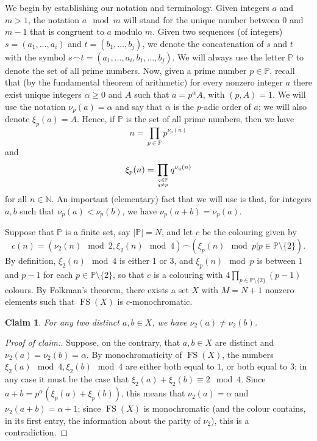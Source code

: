 \documentclass[10pt]{amsart}
\DeclareMathOperator{\fs}{FS}
\newtheorem{claim}{Claim}%
\theoremstyle{definition}
\begin{document}
We begin by establishing our notation and terminology. Given integers $a$ and $m>1$, the notation $a\mod m$ will stand for the unique number between $0$ and $m-1$ that is congruent to $a$ modulo $m$. Given two sequences (of integers) $s=(a_1,\ldots,a_i)$ and $t=(b_1,\ldots,b_j)$, we denote the concatenation of $s$ and $t$ with the symbol $s\frown t=(a_1,\ldots,a_i,b_1,\ldots,b_j)$. We will always use the letter $\mathbb P$ to denote the set of all prime numbers. Now, given a prime number $p\in\mathbb P$, recall that (by the fundamental theorem of arithmetic) for every nonzero integer $a$ there exist unique integers $\alpha\geq0$ and $A$ such that $a=p^\alpha A$, with $(p,A)=1$. We will use the notation $\nu_p(a)=\alpha$ and say that $\alpha$ is the $p$-adic order of $a$; we will also denote $\xi_p(a)=A$. Hence, if $\mathbb P$ is the set of all prime numbers, then we have
\begin{equation*}
n=\prod_{p\in\mathbb P}p^{\nu_p(n)}
\end{equation*}
and
\begin{equation*}
\xi_p(n)=\prod_{{q\in\mathbb P}\atop{q\neq p}}q^{\nu_q(n)}
\end{equation*}
for all $n\in\mathbb N$. An important (elementary) fact that we will use is that, for integers $a,b$ such that $\nu_p(a)<\nu_p(b)$, we have $\nu_p(a+b)=\nu_p(a)$.

Suppose that $\mathbb P$ is a finite set, say $|\mathbb P|=N$, and let $c$ be the colouring given by
\begin{equation*}
c(n)=(\nu_2(n)\mod 2,\xi_2(n)\mod 4)\frown(\xi_p(n)\mod p\big|p\in\mathbb P\setminus\{2\}).
\end{equation*}
By definition, $\xi_2(n)\mod 4$ is either 1 or 3, and $\xi_p(n)\mod p$ is between $1$ and $p-1$ for each $p\in\mathbb P\setminus\{2\}$, so that $c$ is a colouring with $4\prod_{p\in\mathbb P\setminus\{2\}}(p-1)$ colours. By Folkman's theorem, there exists a set $X$ with $M=N+1$ nonzero elements such that $\fs(X)$ is $c$-monochromatic.

\begin{claim}
For any two distinct $a,b\in X$, we have $\nu_2(a)\neq\nu_2(b)$.
\end{claim}

\begin{proof}[Proof of claim:]
Suppose, on the contrary, that $a,b\in X$ are distinct and $\nu_2(a)=\nu_2(b)=\alpha$. By monochromaticity of $\fs(X)$, the numbers $\xi_2(a)\mod 4,\xi_2(b)\mod 4$ are either both equal to $1$, or both equal to $3$; in any case it must be the case that $\xi_2(a)+\xi_2(b)\equiv 2\mod 4$. Since $a+b=p^\alpha(\xi_p(a)+\xi_p(b))$, this means that $\nu_2(a)=\alpha$ and $\nu_2(a+b)=\alpha+1$; since $\fs(X)$ is monochromatic (and the colour contains, in its first entry, the information about the parity of $\nu_2$), this is a contradiction.
\end{proof}
\end{document}
